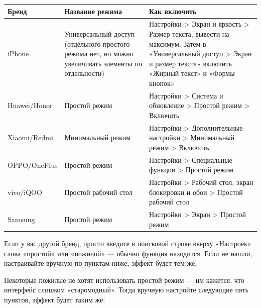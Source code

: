 
\begin{center}
\begin{tabularx}{\linewidth}{|X|X|X|}
\hline
\textbf{Бренд} & \textbf{Название режима} & \textbf{Как включить} \tabularnewline
\hline
iPhone & Универсальный доступ (отдельного простого режима нет, но можно увеличивать элементы по отдельности) & Настройки > Экран и яркость > Размер текста, вывести на максимум. Затем в «Универсальный доступ > Экран и размер текста» включить «Жирный текст» и «Формы кнопок» \tabularnewline
Huawei/Honor & Простой режим & Настройки > Система и обновление > Простой режим > Включить \tabularnewline
Xiaomi/Redmi & Минимальный режим & Настройки > Дополнительные настройки > Минимальный режим > Включить \tabularnewline
OPPO/OnePlus & Простой режим & Настройки > Специальные функции > Простой режим \tabularnewline
vivo/iQOO & Простой рабочий стол & Настройки > Рабочий стол, экран блокировки и обои > Простой рабочий стол \tabularnewline
Samsung & Простой режим & Настройки > Экран > Простой режим \tabularnewline
\hline
\end{tabularx}
\end{center}

Если у вас другой бренд, просто введите в поисковой строке вверху «Настроек» слова «простой» или «пожилой» — обычно функция находится. Если не нашли, настраивайте вручную по пунктам ниже, эффект будет тем же.


Некоторые пожилые не хотят использовать простой режим — им кажется, что интерфейс слишком «старомодный». Тогда вручную настройте следующие пять пунктов, эффект будет таким же:

